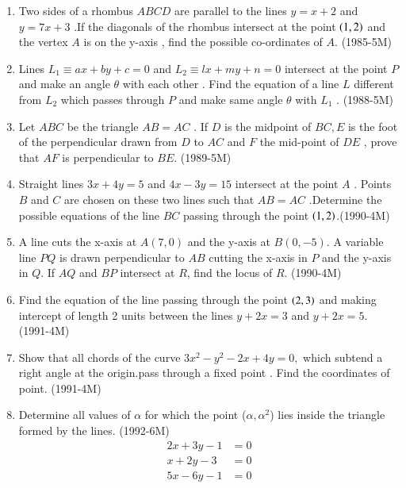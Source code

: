 \documentclass[journal,12pt,twocolumn]{IEEEtran}
\theoremstyle{remark}
\begin{document}
\begin{enumerate}[start=4]
\item Two sides of a rhombus $ABCD$ are parallel to the lines $y=x+2$ and $y=7x+3$ .If the diagonals of the rhombus intersect at the point $\left(1,2\right)$ and the vertex $A$ is on the y-axis , find the possible co-ordinates of $A$.     \hfill{(1985-5M)} 

\item Lines $ L_1 \equiv ax+by+c =0 $ and $ L_2 \equiv lx+my+n =0 $ intersect at the point $P$ and make an angle $\theta$ with each other . Find the equation of a line $L$ different from $L_2$ which passes through $P$ and make same angle $\theta$ with $L_1$ . \hfill{(1988-5M)}


\item Let $ABC$ be the triangle $AB=AC$ . If $D$ is the midpoint of $ BC , E$ is the foot of the perpendicular drawn from $D$ to $AC$ and $F$ the mid-point of $DE$ , prove that $AF$ is perpendicular to $BE.$ \hfill{(1989-5M)}

\item Straight lines $3x + 4y =5$ and $ 4x-3y= 15$ intersect at the point $A$ . Points $B$ and $C$ are chosen on these two lines such that $AB=AC$ .Determine the possible equations of the line $BC$ passing through the point $\left(1,2\right)$.\hfill{(1990-4M)}

\item A line cuts the x-axis at $A(7,0)$ and the y-axis at $B(0,-5)$. A variable line $PQ$ is drawn perpendicular to $AB$ cutting the x-axis in $P$ and the y-axis in $Q$. If $AQ$ and $BP$ intersect at $R$, find the locus of $R$.  \hfill{(1990-4M)}

\item Find the equation of the line passing through the point $\left(2,3\right)$ and making intercept of length 2 units between the lines $ y + 2x = 3 $ and $ y + 2x = 5  $.     \hfill{(1991-4M)}

	\begin{center}

	\end{center}

\item Show that all chords of  the curve $ 3x^2-y^2-2x+4y=0,$ which subtend a right angle at the origin.pass through a fixed point . Find the coordinates of point.     \hfill{(1991-4M)}

\item Determine all values of $\alpha$ for which the point ($\alpha , \alpha^2$) lies inside the triangle formed by the lines.  \hfill{(1992-6M)}
	\begin{align*}  2x+3y-1&=0\\ 
	x+2y-3&=0  \\ 5x-6y-1&=0   \end{align*}

\end{enumerate}
\end{document}

